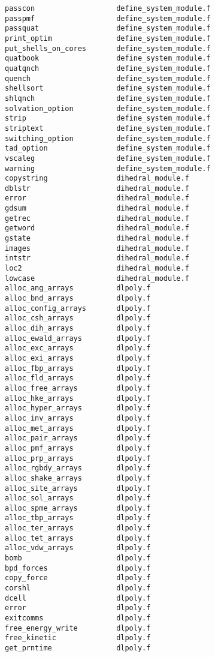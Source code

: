 \begin{verbatim}
passcon                   define_system_module.f
passpmf                   define_system_module.f
passquat                  define_system_module.f
print_optim               define_system_module.f
put_shells_on_cores       define_system_module.f
quatbook                  define_system_module.f
quatqnch                  define_system_module.f
quench                    define_system_module.f
shellsort                 define_system_module.f
shlqnch                   define_system_module.f
solvation_option          define_system_module.f
strip                     define_system_module.f
striptext                 define_system_module.f
switching_option          define_system_module.f
tad_option                define_system_module.f
vscaleg                   define_system_module.f
warning                   define_system_module.f
copystring                dihedral_module.f
dblstr                    dihedral_module.f
error                     dihedral_module.f
gdsum                     dihedral_module.f
getrec                    dihedral_module.f
getword                   dihedral_module.f
gstate                    dihedral_module.f
images                    dihedral_module.f
intstr                    dihedral_module.f
loc2                      dihedral_module.f
lowcase                   dihedral_module.f
alloc_ang_arrays          dlpoly.f
alloc_bnd_arrays          dlpoly.f
alloc_config_arrays       dlpoly.f
alloc_csh_arrays          dlpoly.f
alloc_dih_arrays          dlpoly.f
alloc_ewald_arrays        dlpoly.f
alloc_exc_arrays          dlpoly.f
alloc_exi_arrays          dlpoly.f
alloc_fbp_arrays          dlpoly.f
alloc_fld_arrays          dlpoly.f
alloc_free_arrays         dlpoly.f
alloc_hke_arrays          dlpoly.f
alloc_hyper_arrays        dlpoly.f
alloc_inv_arrays          dlpoly.f
alloc_met_arrays          dlpoly.f
alloc_pair_arrays         dlpoly.f
alloc_pmf_arrays          dlpoly.f
alloc_prp_arrays          dlpoly.f
alloc_rgbdy_arrays        dlpoly.f
alloc_shake_arrays        dlpoly.f
alloc_site_arrays         dlpoly.f
alloc_sol_arrays          dlpoly.f
alloc_spme_arrays         dlpoly.f
alloc_tbp_arrays          dlpoly.f
alloc_ter_arrays          dlpoly.f
alloc_tet_arrays          dlpoly.f
alloc_vdw_arrays          dlpoly.f
bomb                      dlpoly.f
bpd_forces                dlpoly.f
copy_force                dlpoly.f
corshl                    dlpoly.f
dcell                     dlpoly.f
error                     dlpoly.f
exitcomms                 dlpoly.f
free_energy_write         dlpoly.f
free_kinetic              dlpoly.f
get_prntime               dlpoly.f

\end{verbatim}
